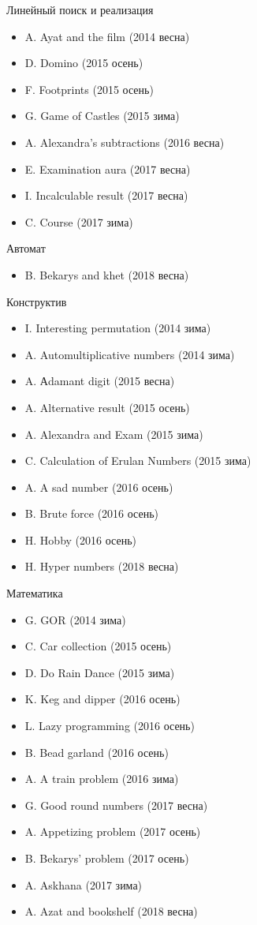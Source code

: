 Линейный поиск и реализация
\begin{itemize}
\item A. Ayat and the film (2014 весна)
\item D. Domino (2015 осень)
\item F. Footprints (2015 осень)
\item G. Game of Castles (2015 зима)
\item A. Alexandra’s subtractions (2016 весна)
\item E. Examination aura (2017 весна)
\item I. Incalculable result (2017 весна)
\item C. Course (2017 зима)
\end{itemize}

Автомат
\begin{itemize}
\item B. Bekarys and khet (2018 весна)
\end{itemize}

Конструктив
\begin{itemize}
\item I. Interesting permutation (2014 зима)
\item A. Automultiplicative numbers (2014 зима)
\item A. Аdamant digit (2015 весна)
\item A. Alternative result (2015 осень)
\item A. Alexandra and Exam (2015 зима)
\item C. Calculation of Erulan Numbers (2015 зима)
\item A. A sad number (2016 осень)
\item B. Brute force (2016 осень)
\item H. Hobby (2016 осень)
\item H. Hyper numbers (2018 весна)
\end{itemize}

Математика
\begin{itemize}
\item G. GOR (2014 зима)
\item C. Car collection (2015 осень)
\item D. Do Rain Dance (2015 зима)
\item K. Keg and dipper (2016 осень)
\item L. Lazy programming (2016 осень)
\item B. Bead garland (2016 осень)
\item A. A train problem (2016 зима)
\item G. Good round numbers (2017 весна)
\item A. Appetizing problem (2017 осень)
\item B. Bekarys’ problem (2017 осень)
\item A. Askhana (2017 зима)
\item A. Azat and bookshelf (2018 весна)
\end{itemize}


